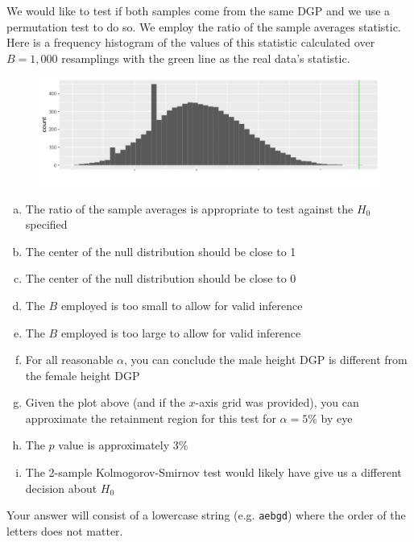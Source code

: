 \documentclass[12pt,landscape]{article}
\newcommand{\instr}{\small Your answer will consist of a lowercase string (e.g. \texttt{aebgd}) where the order of the letters does not matter. \normalsize}
\begin{document}

\problem{}  We would like to test if both samples come from the same DGP and we use a permutation test to do so. We employ the ratio of the sample averages statistic. Here is a frequency histogram of the values of this statistic calculated over $B = 1,000$ resamplings with the green line as the real data's statistic.

\begin{figure}[h]
\centering
\includegraphics[width=5in]{height_ratios}
\end{figure}


\vspace{-0.2cm}\benum{} 

\begin{enumerate}[(a)]
\item The ratio of the sample averages is appropriate to test against the $H_0$ specified
\item The center of the null distribution should be close to 1
\item The center of the null distribution should be close to 0
\item The $B$ employed is too small to allow for valid inference
\item The $B$ employed is too large to allow for valid inference
\item For all reasonable $\alpha$, you can conclude the male height DGP is different from the female height DGP
\item Given the plot above (and if the $x$-axis grid was provided), you can approximate the retainment region for this test for $\alpha = 5\%$ by eye
\item The $p$ value is approximately 3\%
\item The 2-sample Kolmogorov-Smirnov test would likely have give us a different decision about $H_0$
\end{enumerate}
\eenum\instr\pagebreak
\end{document}
